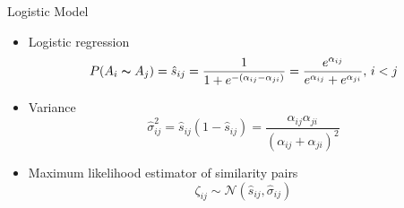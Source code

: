 


\begin{frame}{Logistic Model}

\begin{itemize}
    \item Logistic regression
    \begin{equation}
    \label{eqn:glm}
    P(A_i \thicksim A_j) = \hat{s}_{ij} = \frac{1}{1+e^{-(\alpha_{ij} - \alpha_{ji})}} = \frac{e^{{\alpha}_{ij}}}{e^{{\alpha}_{ij}} + e^{{\alpha}_{ji}}}, \, i<j
\end{equation}
    
    \item Variance
    \begin{equation}
\label{eqn:variance}
     \hat{\sigma}_{ij}^2 = \hat{s}_{ij} (1-\hat{s}_{ij}) = \frac{\alpha_{ij} \alpha_{ji}}{(\alpha_{ij} + \alpha_{ji})^2}
\end{equation}

    \item Maximum likelihood estimator of similarity pairs
    \begin{equation}
\label{eqn:normal_distr}
    \zeta_{ij} \sim \mathcal{N}(\hat{s}_{ij}, \hat{\sigma}_{ij})
\end{equation}

\end{itemize}
    
\end{frame}